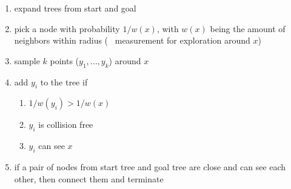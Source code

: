 \begin{multicols*}{2}
\begin{enumerate}
	\item expand trees from start and goal
	\item pick a node with probability $1/w(x)$, with $w(x)$ being the amount of neighbors within radius (~ measurement for exploration around $x$)
	\item sample $k$ points ($y_1, ..., y_k$) around $x$
	\item add $y_i$ to the tree if
	\begin{enumerate}
		\item $1/w(y_i) > 1/w(x)$
		\item $y_i$ is collision free
		\item $y_i$ can see $x$
	\end{enumerate}
	\item if a pair of nodes from start tree and goal tree are close and can see each other, then connect them and terminate
\end{enumerate}


\end{multicols*}
